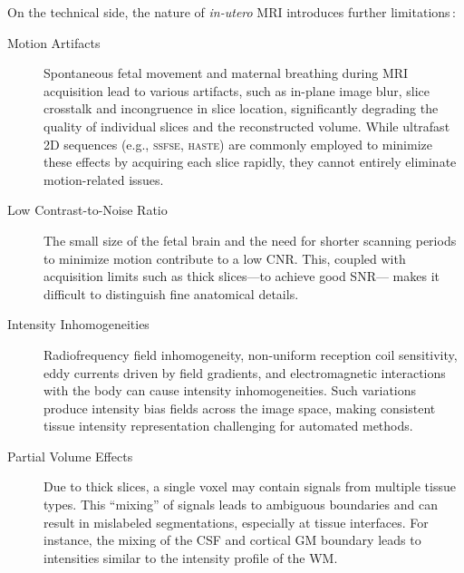 On the technical side, the nature of \textit{in-utero} MRI introduces further limitations\,\cite{Ciceri2023}:
\begin{description}
    \item[Motion Artifacts] Spontaneous fetal movement and maternal breathing during MRI acquisition lead to various artifacts, such as in-plane image blur, slice crosstalk and incongruence in slice location, significantly degrading the quality of individual slices and the reconstructed volume. While ultrafast 2D sequences (e.g., \textsc{ssfse}, \textsc{haste}) are commonly employed to minimize these effects by acquiring each slice rapidly, they cannot entirely eliminate motion-related issues.
    \item[Low Contrast-to-Noise Ratio] The small size of the fetal brain and the need for shorter scanning periods to minimize motion contribute to a low CNR. This, coupled with acquisition limits such as thick slices---to achieve good SNR--- makes it difficult to distinguish fine anatomical details.
    \item[Intensity Inhomogeneities] Radiofrequency field inhomogeneity, non-uniform reception coil sensitivity, eddy currents driven by field gradients, and electromagnetic interactions with the body can cause intensity inhomogeneities. Such variations produce intensity bias fields across the image space, making consistent tissue intensity representation challenging for automated methods.
    \item[Partial Volume Effects] Due to thick slices, a single voxel may contain signals from multiple tissue types. This \enquote{mixing} of signals leads to ambiguous boundaries and can result in mislabeled segmentations, especially at tissue interfaces. For instance, the mixing of the CSF and cortical GM boundary leads to intensities similar to the intensity profile of the WM.
\end{description}

